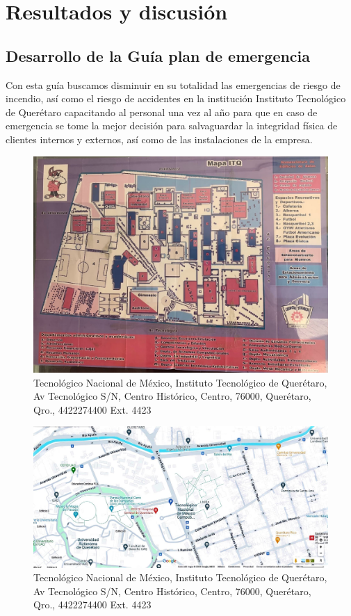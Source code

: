     \section{Resultados y discusión}
    
    \subsection{Desarrollo de la Guía plan de emergencia}
    Con esta guía buscamos disminuir en su totalidad las emergencias de riesgo de incendio, así como el riesgo de accidentes en la institución Instituto Tecnológico de Querétaro capacitando al personal una vez al año para que en caso de emergencia se tome la mejor decisión para salvaguardar la integridad física de clientes internos y externos, así como de las instalaciones de la empresa.
    \begin{figure}[H]
        \centering
        \includegraphics[trim = {1mm 1mm 1mm 1mm},clip,scale=0.3]{8/Img/Plano del ITQ.pdf}
        \caption{Tecnológico Nacional de México, Instituto Tecnológico de Querétaro, Av Tecnológico S/N, Centro Histórico, Centro, 76000, Querétaro, Qro., 4422274400 Ext. 4423}
        \label{Plano del ITQ}
    \end{figure}
    \begin{figure}[H]
        \centering
        \includegraphics[trim = {1mm 1mm 1mm 1mm},clip,scale=0.3]{8/Img/Mapa Itq.pdf}
        \caption{Tecnológico Nacional de México, Instituto Tecnológico de Querétaro, Av Tecnológico S/N, Centro Histórico, Centro, 76000, Querétaro, Qro., 4422274400 Ext. 4423}
        \label{Mapa Itq}
    \end{figure}
